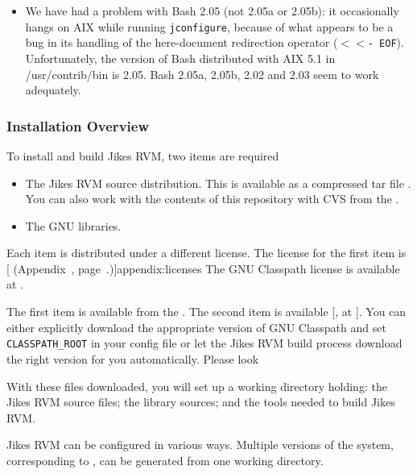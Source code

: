 \begin{itemize}
\item We have had a problem with Bash 2.05 (not
  2.05a or 2.05b): it occasionally hangs on AIX while running
  \texttt{jconfigure}, because of what appears to be a bug in its handling of
  the here-document redirection operator (\texttt{$<<$- EOF}).  Unfortunately, the
  version of Bash distributed with AIX 5.1 in /usr/contrib/bin is
  2.05.   Bash 2.05a, 2.05b, 2.02 and 2.03 seem to work adequately.

\end{itemize}

\subsubsection{Installation Overview}\label{sec:installDetails}

To install and build Jikes\TMweb{} RVM, two items are required
\begin{itemize}
\item The Jikes RVM source distribution.  This is available as a
compressed tar file \texttt{\RVMTarFile}.  You can also work with the
contents of this repository with CVS from the 
.

\item The GNU 
 libraries. 
\end{itemize}

Each item is distributed under a different license.  The license for
the first item is [ (Appendix~\Ref, page~\Pageref.)]{appendix:licenses}
The GNU Classpath license is available at 
\xlink{\texttt{\classpathURL}}{\classpathURL}. 

The first item is available  from the . The second item is
available [, at \texttt{\classpathURL}]{\classpathURL}.
You can either explicitly download the appropriate version of GNU
Classpath and set \texttt{CLASSPATH\_ROOT} in your config file or let
the Jikes RVM build process download the right version for you
automatically.  Please look \AtManualClasspathRootDiscussion{}

With these files downloaded, you will set up 
a working directory holding: the Jikes RVM source files; the 
library sources; and the tools needed to build Jikes RVM.\@ 

%
Jikes RVM can be configured in various ways.  Multiple versions of the system,
corresponding to , can be generated from 
one working directory.   

